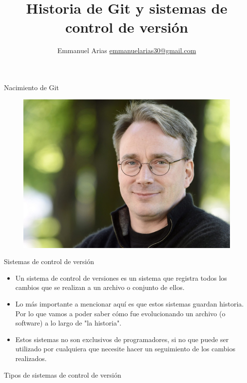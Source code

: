 \documentclass{beamer}
\title{Historia de Git y sistemas de control de versión}
\author{Emmanuel Arias \href{mailto:emmanuelarias30@gmail.com}{emmanuelarias30@gmail.com}}
\begin{document}
\begin{frame}[plain]
    \maketitle
\end{frame}
\begin{frame}{Nacimiento de Git}
\begin{figure}[H]
	\centering
	\includegraphics[width=0.7\linewidth]{img/LinusTorvalds}
	\label{fig:linustorvalds}
\end{figure}
\end{frame}
\begin{frame}{Sistemas de control de versión}
\begin{itemize}
	\item Un sistema de control de versiones es un sistema que registra todos los cambios
	que se realizan a un archivo o conjunto de ellos.
	\item Lo más importante a mencionar aquí es que estos sistemas guardan historia. Por lo que
	vamos a poder saber cómo fue evolucionando un archivo (o software) a lo largo de "la historia".
	\item Estos sistemas no son exclusivos de programadores, si no que puede ser utilizado
	por cualquiera que necesite hacer un seguimiento de los cambios realizados.
\end{itemize}	
\end{frame}

\begin{frame}
   \Huge Tipos de sistemas de control de versión
\end{frame}
\end{document}
